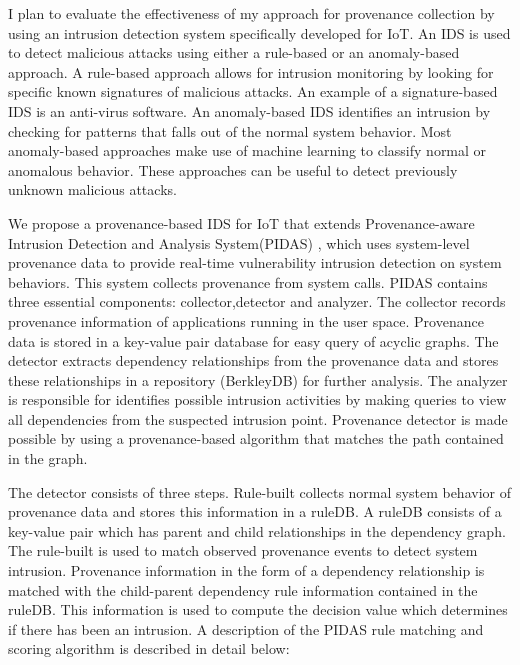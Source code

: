 I plan to evaluate the effectiveness of my approach for provenance collection by using an intrusion detection system specifically developed for IoT. An IDS is used to detect malicious attacks using either a rule-based or an anomaly-based approach. A rule-based approach allows for intrusion monitoring by looking for specific known signatures of malicious attacks. An example of a signature-based IDS is an anti-virus software. An anomaly-based IDS identifies an intrusion by checking for patterns that falls out of the normal system behavior. Most anomaly-based approaches make use of machine learning to classify normal or anomalous behavior. These approaches can be useful to detect previously unknown malicious attacks. 
\par We propose a provenance-based IDS for IoT that extends Provenance-aware Intrusion Detection and Analysis System(PIDAS) \cite{Xie:2016:UID:2936026.2936232}, which uses system-level provenance data to provide real-time vulnerability intrusion detection on system behaviors. This system collects provenance from system calls. PIDAS contains three essential components: collector,detector and analyzer. The collector records provenance information of applications running in the user space. Provenance data is stored in a key-value pair database for easy query of acyclic graphs. The detector extracts dependency relationships from the provenance data and stores these relationships in a repository (BerkleyDB) for further analysis. The analyzer is responsible for identifies possible intrusion activities by making queries to view all dependencies from the suspected intrusion point. Provenance detector is made possible by using a provenance-based algorithm that matches the path contained in the graph.


The detector consists of three steps. Rule-built collects normal system behavior of provenance data and stores this information in a ruleDB. A ruleDB consists of a key-value pair which has parent and child relationships in the dependency graph. The rule-built is used to match observed provenance events  to detect system intrusion. Provenance information in the form of a dependency relationship is matched with the child-parent dependency rule information contained in the ruleDB. This information is used to compute the decision value which determines if there has been an intrusion.  A description of the PIDAS rule matching and scoring algorithm is described in detail below: 

